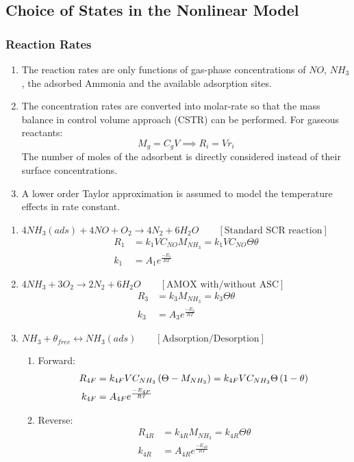 \subsection{Choice of States in the Nonlinear Model}
\subsubsection{Reaction Rates}
\begin{enumerate}
\item The reaction rates are only functions of gas-phase concentrations of $NO$,
$NH_3$, the adsorbed Ammonia and the available adsorption sites.

\item The concentration rates are converted into molar-rate so that the
mass balance in control volume approach (CSTR) can be performed. For gaseous reactants:
$$ M_g = C_g V \implies R_i = V r_i $$
The number of moles of the adsorbent is directly considered instead of their
surface concentrations.

\item A lower order Taylor approximation is assumed to model the temperature
effects in rate constant.
\end{enumerate}

\begin{enumerate}
\item $4 NH_3 (ads) + 4 NO + O_2 \longrightarrow 4 N_2 + 6 H_2O
\qquad [\text{Standard SCR reaction}] $
\begin{align*}
    R_1 &= k_1 V C_{NO} M_{NH_3} = k_1V C_{NO} \Theta \theta\\
    k_1 &= A_1 e^{\frac{-E_1}{RT}}
\end{align*}

\item $4 NH_3 + 3 O_2 \longrightarrow 2 N_2 + 6 H_2O \qquad [\text{AMOX with/without ASC}]$
\begin{align*}
    R_3 &= k_3 M_{NH_3} = k_3 \Theta \theta\\
    k_3 &= A_3 e^{\frac{-E_3}{RT}}
\end{align*}

\item $NH_3 + \theta_{free} \longleftrightarrow NH_3(ads) \qquad [\text{Adsorption/Desorption}]$
\begin{enumerate}
\item Forward:
\begin{align*}
    R_{4F} &= k_{4F} V C_{NH_3} \left( \Theta - M_{NH_3} \right)
            = k_{4F} V C_{NH_3} \Theta \left( 1 - \theta \right)\\
    k_{4F} &= A_{4F} e^{\frac{-E_{4F}}{RT}}
\end{align*}

\item Reverse:
\begin{align*}
    R_{4R} &= k_{4R} M_{NH_3}
            = k_{4R} \Theta \theta \\
    k_{4R} &= A_{4R} e^{\frac{-E_{4R}}{RT}}
\end{align*}
\end{enumerate}
\end{enumerate}

